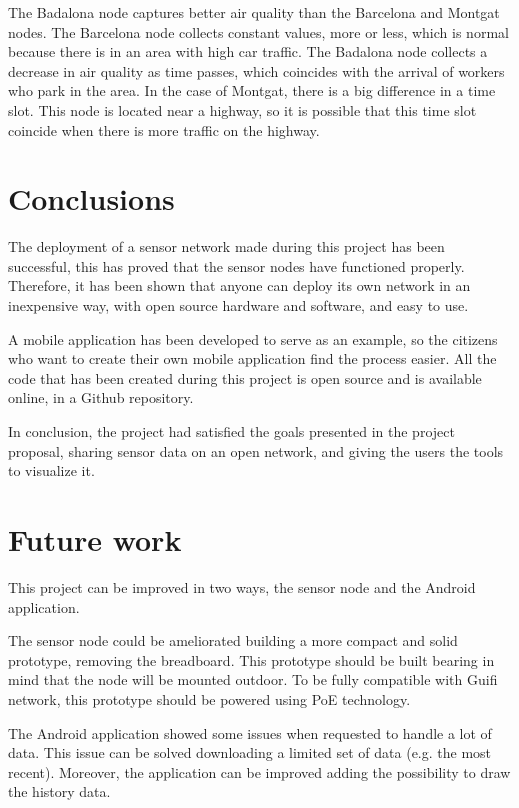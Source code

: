 \documentclass[12pt, a4paper,twoside]{tesi_upf}
\begin{document}
      The Badalona node captures better air quality than the Barcelona and Montgat nodes. The Barcelona node collects constant values, more or less, which is normal because there is in an area with high car traffic. The Badalona node collects a decrease in air quality as time passes, which coincides with the arrival of workers who park in the area. In the case of Montgat, there is a big difference in a time slot. This node is located near a highway, so it is possible that this time slot coincide when there is more traffic on the highway.

\chapter{Conclusions}
\label{Chapter6}
  
  The deployment of a sensor network made during this project has been successful, this has proved that the sensor nodes have functioned properly.  
  Therefore, it has been shown that anyone can deploy its own network in an inexpensive way, with open source hardware and software, and easy to use.
  
  A mobile application has been developed to serve as an example, so the citizens who want to create their own mobile application find the process easier.
 	All the code that has been created during this project is open source and is available online, in a Github repository.
  
  In conclusion, the project had satisfied the goals presented in the project proposal, sharing sensor data on an open network, and giving the users the tools to visualize it.

\chapter{Future work}
\label{Chapter7}
  
  This project can be improved in two ways, the sensor node and the Android application.
  
  The sensor node could be ameliorated building a more compact and solid prototype, removing the breadboard. This prototype should be built bearing in mind that the node will be mounted outdoor. To be fully compatible with Guifi network, this prototype should be powered using PoE technology.
  
  The Android application showed some issues when requested to handle a lot of data. This issue can be solved downloading a limited set of data (e.g. the most recent).
  Moreover, the application can be improved adding the possibility to draw the history data.
  
\end{document}
